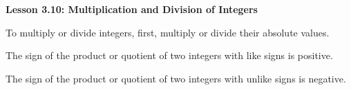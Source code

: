 \begin{center}
\textbf{Lesson 3.10: Multiplication and Division of Integers}
\end{center}

\vspace*{-1.5ex}

\noindent To multiply or divide integers, first, multiply or divide their absolute values.

\noindent The sign of the product or quotient of two integers with like signs is positive.

\noindent The sign of the product or quotient of two integers with unlike signs is negative.


